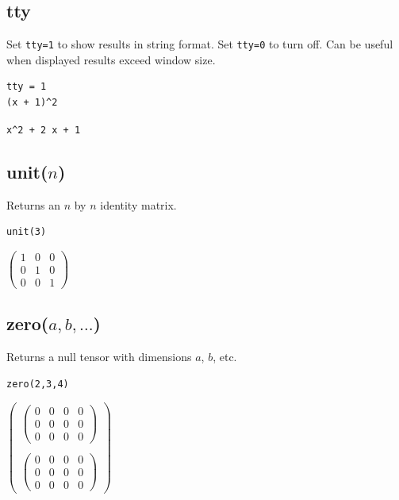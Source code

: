 \subsection*{tty}

Set \verb$tty=1$ to show results in string format.
Set \verb$tty=0$ to turn off.
Can be useful when displayed results exceed window size.

{\color{blue}
\begin{verbatim}
tty = 1
(x + 1)^2
\end{verbatim}
}

\verb$x^2 + 2 x + 1$

\subsection*{unit($n$)}

Returns an $n$ by $n$ identity matrix.

{\color{blue}
\begin{verbatim}
unit(3)
\end{verbatim}
}

$\displaystyle
\begin{pmatrix}
1 & 0 & 0
\\[1ex]
0 & 1 & 0
\\[1ex]
0 & 0 & 1
\end{pmatrix}
$

\subsection*{zero($a,b,\ldots$)}

Returns a null tensor with dimensions $a$, $b$, etc.

{\color{blue}
\begin{verbatim}
zero(2,3,4)
\end{verbatim}
}

$
\begin{pmatrix}
\begin{pmatrix}0&0&0&0\\0&0&0&0\\0&0&0&0\end{pmatrix}
\\
\\
\begin{pmatrix}0&0&0&0\\0&0&0&0\\0&0&0&0\end{pmatrix}
\end{pmatrix}
$



